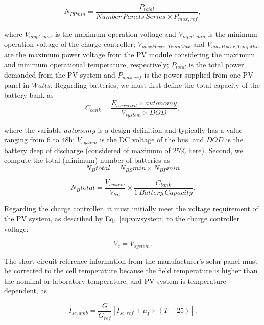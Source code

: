 \documentclass[journal]{IEEEtran}
\begin{document}
\begin{equation}
\label{eq:NPPmin}
N_{PPmin} = \dfrac{P_{total}}{Number\,Panels\,Series \times P_{max,ref}},
\end{equation}

\noindent where $V_{mppt,max}$ is the maximum operation voltage and $V_{mppt,min}$ 
is the minimum operation voltage of the charge controller; $V_{maxPower,TempMax}$ and 
$V_{maxPower,TempMin}$ are the maximum power voltage from the PV module considering 
the maximum and minimum operational temperature, respectively; 
$P_{total}$ is the total power demanded from the PV system and 
$P_{max,ref}$ is the power supplied from one PV panel in $Watts$.
Regarding batteries, we must first define the total capacity of the battery bank as
%
\begin{equation}
\label{eq:Cbank}
C_{bank} = \dfrac{E_{corrected} \times autonomy}{V_{system} \times DOD},
\end{equation}

\noindent where the variable $autonomy$ is a design definition and typically has a value ranging from $6$ to $48$h; $ V_{system} $ 
is the DC voltage of the bus, and $ DOD $ is the battery deep of discharge (considered of maximum of 25\% here).
%
Second, we compute the total (minimum) number of batteries as 
%
\begin{equation}
\label{eq:Nbtotal}
N_{B}total = N_{BS}min \times N_{BP}min
\end{equation}

\begin{equation}
\label{eq:Nbtotal2}
N_{B}total = \dfrac{V_{system}}{V_{bat}} \times \dfrac{C_{bank}}{1 \,Battery \, Capacity}.
\end{equation}

Regarding the charge controller, it must initially meet the voltage requirement of the PV system, as described by Eq.~\eqref{eq:vcvsystem} to the charge controller voltage: 

\begin{equation}
\label{eq:vcvsystem}
V_{c} = V_{system}.
\end{equation}

The short circuit reference information from the manufacturer's solar panel must be corrected 
to the cell temperature because the field temperature is higher than the nominal or laboratory temperature, and PV system is temperature dependent, as 

\begin{equation}
\label{eq:iscamb}
I_{sc,amb} = \dfrac{G}{G_{ref}} \left[ I_{sc,ref} + \mu_{I} \times (T-25) \right]. 
\end{equation}
\end{document}
